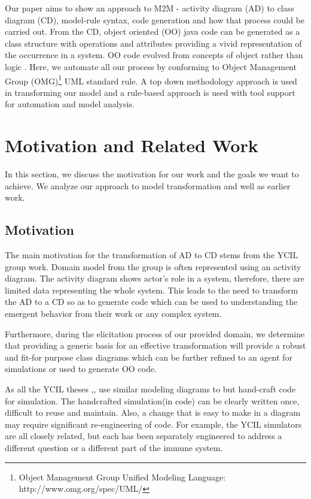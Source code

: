 \documentclass[10pt]{article}
\begin{document}
Our paper aims to show an approach to M2M - activity diagram (AD) to class diagram (CD), model-rule syntax, code generation and how that process could be carried out. From the CD, object oriented (OO) java code can be generated as a class structure with operations and attributes providing a vivid representation of the occurrence in a system. OO code evolved from concepts of object rather than logic \cite{Kindler}. Here, we automate all our process by conforming to Object Management Group (OMG)\footnote{Object Management Group Unified Modeling Language: http://www.omg.org/spec/UML/} UML standard rule. A top down methodology approach is used in transforming our model and a rule-based approach is used with tool support for automation and model analysis. 

\section{Motivation and Related Work}

In this section, we discuss the motivation for our work and the goals we want to achieve. We analyze our approach to model transformation and well as earlier work.
	\subsection{Motivation}
The main motivation for the transformation of AD to CD stems from the YCIL group work. Domain model from the group is often represented using an activity diagram. The activity diagram shows actor's role in a system, therefore, there are limited data representing the whole system. This leads to the need to transform the AD to a CD so as to generate code which can be used to understanding the emergent behavior from their work or any complex system.

Furthermore, during the elicitation process of our provided domain, we determine that providing a generic basis for an effective transformation will provide a robust and fit-for purpose class diagrams which can be further refined to an agent for simulations or used to generate OO code.
	
As all the YCIL theses \cite{Read2011},\cite{Moyo2014},\cite{Richard2014} use similar modeling diagrams to but hand-craft code for simulation. The handcrafted simulation(in code) can be clearly written once, difficult to reuse and maintain. Also, a change that is easy to make in a diagram may require significant re-engineering of code. For example, the YCIL simulators are all closely related, but each has been separately engineered to address a different question or a different part of the immune system.
\end{document}
